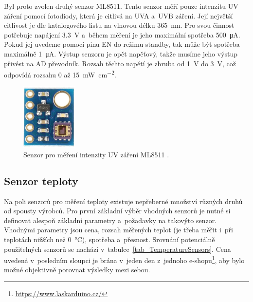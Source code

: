 Byl proto zvolen druhý senzor ML8511. Tento senzor měří pouze intenzitu UV záření pomocí fotodiody, která je citlivá na UVA a~UVB záření. Její největší citlivost je dle katalogového listu \cite{dat_ML8511} na vlnovou délku \SI{365}{\nano\metre}. Pro svou činnost potřebuje napájení \SI{3,3}{\volt} a~během měření je jeho maximální spotřeba \SI{500}{\micro\ampere}. Pokud jej uvedeme pomocí pinu EN do režimu standby, tak může být spotřeba maximálně \SI{1}{\micro\ampere}. Výstup senzoru je opět napěťový, takže musíme jeho výstup přivést na AD převodník. Rozsah těchto napětí je zhruba od \SI{1}{\volt} do \SI{3}{\volt}, což odpovídá rozsahu \SI{0}{} až \SI{15}{\milli\watt\per\centi\metre\squared}.

\begin{figure}[h]
    \centering
    \includegraphics[width=0.25\textwidth]{obrazky/ml8511.jpg}
    \caption{Senzor pro měření intenzity UV záření ML8511 \cite{picture_ML8511}.}
    \label{fig_ml8511}
\end{figure}

\subsection{Senzor teploty}

Na poli senzorů pro měření teploty existuje nepřeberné množství různých druhů od spousty výrobců. Pro první základní výběr vhodných senzorů je nutné si definovat alespoň základní parametry a~požadavky na takovýto senzor. Vhodnými parametry jsou cena, rozsah měřených teplot (je třeba měřit i~při teplotách nižších než \SI{0}{\celsius}), spotřeba a~přesnost. Srovnání potenciálně použitelných senzorů se nachází v~tabulce~\ref{tab_TemperatureSensors}. Cena uvedená v~posledním sloupci je brána v~jeden den z~jednoho e-shopu\footnote{\url{https://www.laskarduino.cz/}}, aby bylo možné objektivně porovnat výsledky mezi sebou.

